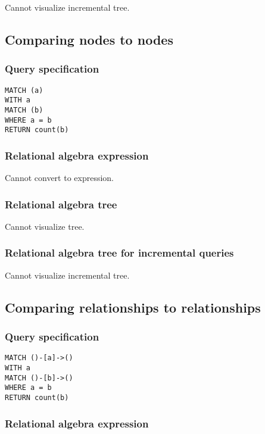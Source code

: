 Cannot visualize incremental tree.

\subsection{Comparing nodes to nodes}

\subsubsection*{Query specification}

\begin{lstlisting}
MATCH (a)
WITH a
MATCH (b)
WHERE a = b
RETURN count(b)
\end{lstlisting}

\subsubsection*{Relational algebra expression}

Cannot convert to expression.

\subsubsection*{Relational algebra tree}

Cannot visualize tree.

\subsubsection*{Relational algebra tree for incremental queries}

Cannot visualize incremental tree.

\subsection{Comparing relationships to relationships}

\subsubsection*{Query specification}

\begin{lstlisting}
MATCH ()-[a]->()
WITH a
MATCH ()-[b]->()
WHERE a = b
RETURN count(b)
\end{lstlisting}

\subsubsection*{Relational algebra expression}


